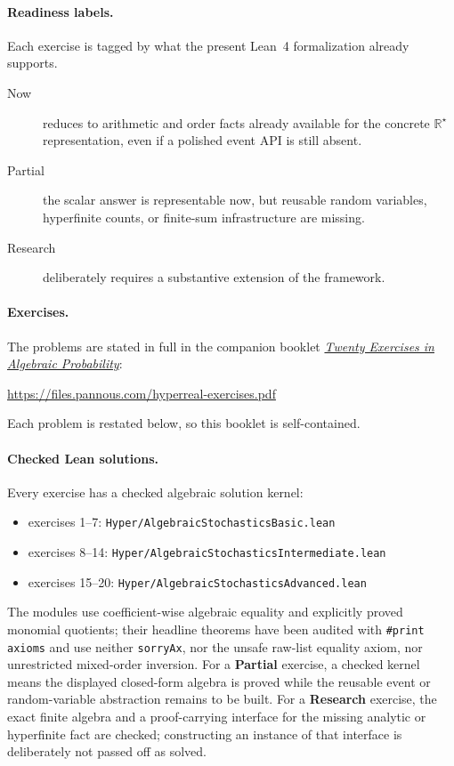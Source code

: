 \documentclass[11pt]{article}
\newcommand{\Rstar}{\mathbb{R}^{\star}}
\begin{document}
\paragraph{Readiness labels.} Each exercise is tagged by what the present
Lean~4 formalization already supports.
\begin{description}
\item[Now] reduces to arithmetic and order facts already available for the
concrete $\Rstar$ representation, even if a polished event API is still absent.
\item[Partial] the scalar answer is representable now, but reusable random
variables, hyperfinite counts, or finite-sum infrastructure are missing.
\item[Research] deliberately requires a substantive extension of the framework.
\end{description}

\paragraph{Exercises.} The problems are stated in full in the companion
booklet \href{https://files.pannous.com/hyperreal-exercises.pdf}{\emph{Twenty Exercises in Algebraic Probability}}:
\begin{center}\small\url{https://files.pannous.com/hyperreal-exercises.pdf}\end{center}
Each problem is restated below, so this booklet is self-contained.

\paragraph{Checked Lean solutions.} Every exercise has a checked algebraic
solution kernel:
\begin{itemize}[nosep, leftmargin=2em]
\item exercises 1--7: \texttt{Hyper/AlgebraicStochasticsBasic.lean}
\item exercises 8--14: \texttt{Hyper/AlgebraicStochasticsIntermediate.lean}
\item exercises 15--20: \texttt{Hyper/AlgebraicStochasticsAdvanced.lean}
\end{itemize}
The modules use coefficient-wise algebraic equality and explicitly proved
monomial quotients; their headline theorems have been audited with
\texttt{\#print axioms} and use neither \texttt{sorryAx}, nor the unsafe
raw-list equality axiom, nor unrestricted mixed-order inversion. For a
\textbf{Partial} exercise, a checked kernel means the displayed closed-form
algebra is proved while the reusable event or random-variable abstraction
remains to be built. For a \textbf{Research} exercise, the exact finite algebra
and a proof-carrying interface for the missing analytic or hyperfinite fact are
checked; constructing an instance of that interface is deliberately not passed
off as solved.
\end{document}
